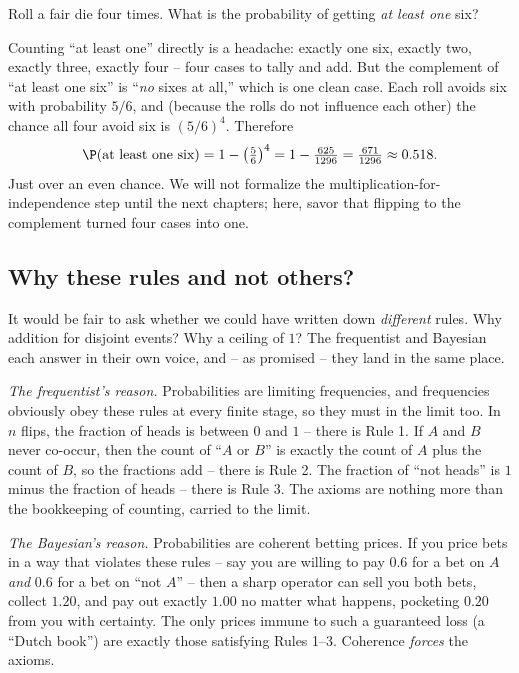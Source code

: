 \begin{example}
\label{ch01:ex-complement}
Roll a fair die four times. What is the probability of getting \emph{at least one}
six?

Counting ``at least one'' directly is a headache: exactly one six, exactly two,
exactly three, exactly four -- four cases to tally and add. But the complement of
``at least one six'' is ``\emph{no} sixes at all,'' which is one clean case. Each
roll avoids six with probability $5/6$, and (because the rolls do not influence
each other) the chance all four avoid six is $(5/6)^4$. Therefore
\[
  \P(\text{at least one six}) = 1 - \left(\tfrac{5}{6}\right)^4
  = 1 - \tfrac{625}{1296} = \tfrac{671}{1296} \approx 0.518.
\]
Just over an even chance. We will not formalize the multiplication-for-independence
step until the next chapters; here, savor that flipping to the complement turned
four cases into one.
\end{example}

\subsection{Why these rules and not others?}
\label{ch01:why-these}

It would be fair to ask whether we could have written down \emph{different} rules.
Why addition for disjoint events? Why a ceiling of $1$? The frequentist and
Bayesian each answer in their own voice, and -- as promised -- they land in the
same place.

\begin{whybox}
\emph{The frequentist's reason.} Probabilities are limiting frequencies, and
frequencies obviously obey these rules at every finite stage, so they must in the
limit too. In $n$ flips, the fraction of heads is between $0$ and $1$ -- there is
Rule 1. If $A$ and $B$ never co-occur, then the count of ``$A$ or $B$'' is exactly
the count of $A$ plus the count of $B$, so the fractions add -- there is Rule 2.
The fraction of ``not heads'' is $1$ minus the fraction of heads -- there is
Rule 3. The axioms are nothing more than the bookkeeping of counting, carried to
the limit.

\emph{The Bayesian's reason.} Probabilities are coherent betting prices. If you
price bets in a way that violates these rules -- say you are willing to pay $0.6$
for a bet on $A$ \emph{and} $0.6$ for a bet on ``not $A$'' -- then a sharp operator
can sell you both bets, collect $1.20$, and pay out exactly $1.00$ no matter what
happens, pocketing $0.20$ from you with certainty. The only prices immune to such a
guaranteed loss (a ``Dutch book'') are exactly those satisfying Rules 1--3. Coherence
\emph{forces} the axioms.
\end{whybox}

